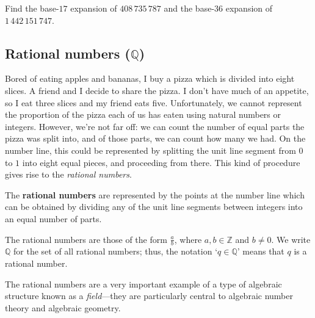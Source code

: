 \begin{exercise}
Find the base-$17$ expansion of $408\,735\,787$ and the base-$36$ expansion of $1\,442\,151\,747$.
\end{exercise}

\subsection*{Rational numbers ($\mathbb{Q}$)}

Bored of eating apples and bananas, I buy a pizza which is divided into eight slices. A friend and I decide to share the pizza. I don't have much of an appetite, so I eat three slices and my friend eats five. Unfortunately, we cannot represent the proportion of the pizza each of us has eaten using natural numbers or integers. However, we're not far off: we can count the number of equal parts the pizza was split into, and of those parts, we can count how many we had. On the number line, this could be represented by splitting the unit line segment from $0$ to $1$ into eight equal pieces, and proceeding from there. This kind of procedure gives rise to the \textit{rational numbers}.

\begin{definition}
\label{defRationalsInformal}
The \textbf{rational numbers} are represented by the points at the number line which can be obtained by dividing any of the unit line segments between integers into an equal number of parts.
\begin{center}
\end{center}
The rational numbers are those of the form $\frac{a}{b}$, where $a,b \in \mathbb{Z}$ and $b \ne 0$. We write $\mathbb{Q}$  for the set of all rational numbers; thus, the notation `$q \in \mathbb{Q}$' means that $q$ is a rational number.
\end{definition}

The rational numbers are a very important example of a type of algebraic structure known as a \textit{field}---they are particularly central to algebraic number theory and algebraic geometry.

